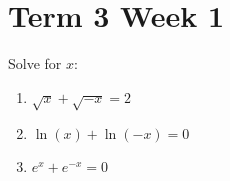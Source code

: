 \documentclass[../main.tex]{subfiles}
\begin{document}
\section*{Term 3 Week 1}
Solve for $x$:
\begin{enumerate}[itemsep=1cm]
    \item 
    $\sqrt{x}+\sqrt{-x}=2$

    \item 
    $\ln{(x)}+\ln{(-x)}=0$

    \item 
    $e^x+e^{-x}=0$

    

    \end{enumerate}
\end{document}

